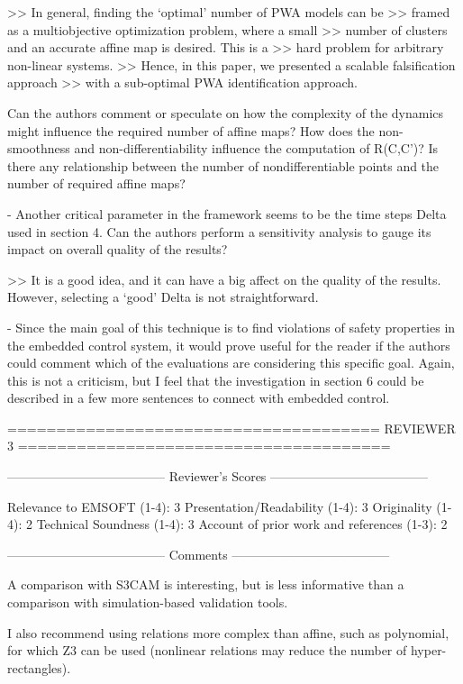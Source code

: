 >> In general, finding the `optimal' number of PWA models can be
>> framed as a multiobjective optimization problem, where a small
>> number of clusters and an accurate affine map is desired. This is a
>> hard problem for arbitrary non-linear systems.
>> Hence, in this paper, we presented a scalable falsification approach
>> with a sub-optimal PWA identification approach.


Can the authors comment or speculate on how the complexity of the
dynamics might influence the required number of affine maps? How does
the non-smoothness and non-differentiability influence the computation
of R(C,C’)? Is there any relationship between the number of
nondifferentiable points and the number of required affine maps?


- Another critical parameter in the framework seems to be the time steps Delta
used in section 4. Can the authors perform a sensitivity analysis to gauge its
impact on overall quality of the results?

>> It is a good idea, and it can have a big affect on the quality of
the results. However, selecting a `good' Delta is not straightforward.

- Since the main goal of this technique is to find violations of safety
properties in the embedded control system, it would prove useful for the reader
if the authors could comment which of the evaluations are considering this
specific goal. Again, this is not a criticism, but I feel that the
investigation in section 6 could be described in a few more sentences to
connect with embedded control.


======================================
                            REVIEWER 3
======================================


--------------------------------------
Reviewer's Scores
--------------------------------------

               Relevance to EMSOFT (1-4): 3
          Presentation/Readability (1-4): 3
                       Originality (1-4): 2
               Technical Soundness (1-4): 3
Account of prior work and references (1-3): 2


--------------------------------------
Comments
--------------------------------------

A comparison with S3CAM is interesting, but is less informative than a
comparison with simulation-based validation tools.

I also recommend using relations more complex than affine, such as
polynomial, for which Z3 can be used (nonlinear relations may reduce
the number of hyper-rectangles).


